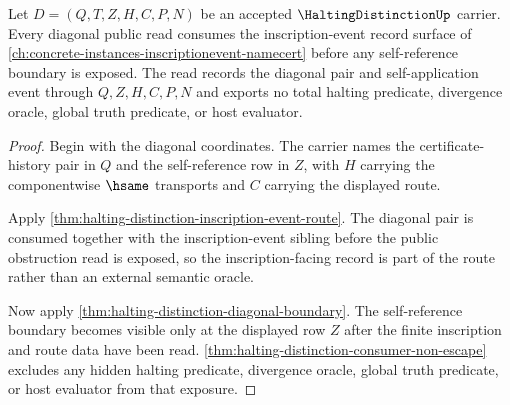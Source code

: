 \begin{theorem}
\label{thm:halting-distinction-inscription-event-boundary}
Let $D=(Q,T,Z,H,C,P,N)$ be an accepted $\HaltingDistinctionUp$ carrier. Every diagonal public read consumes the inscription-event record surface of \autoref{ch:concrete-instances-inscriptionevent-namecert} before any self-reference boundary is exposed. The read records the diagonal pair and self-application event through $Q,Z,H,C,P,N$ and exports no total halting predicate, divergence oracle, global truth predicate, or host evaluator.
\end{theorem}
\begin{proof}
Begin with the diagonal coordinates. The carrier names the certificate-history pair in $Q$ and the self-reference row in $Z$, with $H$ carrying the componentwise $\hsame$ transports and $C$ carrying the displayed route.

Apply \autoref{thm:halting-distinction-inscription-event-route}. The diagonal pair is consumed together with the inscription-event sibling before the public obstruction read is exposed, so the inscription-facing record is part of the route rather than an external semantic oracle.

Now apply \autoref{thm:halting-distinction-diagonal-boundary}. The self-reference boundary becomes visible only at the displayed row $Z$ after the finite inscription and route data have been read. \autoref{thm:halting-distinction-consumer-non-escape} excludes any hidden halting predicate, divergence oracle, global truth predicate, or host evaluator from that exposure.
\end{proof}

